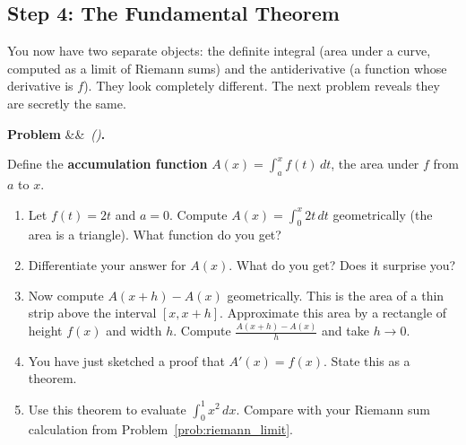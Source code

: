 \documentclass[12pt, a4paper]{article}
\newcounter{problem}
\newenvironment{problem}[1][]{%
  \refstepcounter{problem}%
  \par\vspace{6pt}%
  \noindent\textbf{\color{MidBlue}Problem \theproblem}%
  \ifx&#1&\else\ \textit{(#1)}\fi\textbf{.}\enskip
}{\par\vspace{4pt}}
\begin{document}
\subsection{Step 4: The Fundamental Theorem}

You now have two separate objects: the definite integral (area under a curve, computed as a limit of Riemann sums) and the antiderivative (a function whose derivative is $f$). They look completely different. The next problem reveals they are secretly the same.

\begin{problem}
\label{prob:ftc_discover}
Define the \textbf{accumulation function} $A(x) = \int_a^x f(t)\,dt$, the area under $f$ from $a$ to $x$.
\begin{enumerate}[label=(\alph*), topsep=2pt]
  \item Let $f(t) = 2t$ and $a = 0$. Compute $A(x) = \int_0^x 2t\,dt$ geometrically (the area is a triangle). What function do you get?
  \item Differentiate your answer for $A(x)$. What do you get? Does it surprise you?
  \item Now compute $A(x+h) - A(x)$ geometrically. This is the area of a thin strip above the interval $[x, x+h]$. Approximate this area by a rectangle of height $f(x)$ and width $h$. Compute $\frac{A(x+h)-A(x)}{h}$ and take $h\to 0$.
  \item You have just sketched a proof that $A'(x) = f(x)$. State this as a theorem.
  \item Use this theorem to evaluate $\int_0^1 x^2\,dx$. Compare with your Riemann sum calculation from Problem~\ref{prob:riemann_limit}.
\end{enumerate}
\end{problem}

\begin{center}
\end{center}
\end{document}
